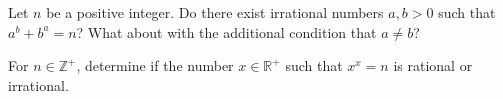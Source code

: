 Let $n$ be a positive integer.
Do there exist irrational numbers $a, b > 0$ such that $a^b + b^a = n$?
What about with the additional condition that $a \neq b$?

For $n \in \mathbb{Z}^{+}$, determine if the number $x \in \mathbb{R}^{+}$ such that $x^x = n$ is rational or irrational.
